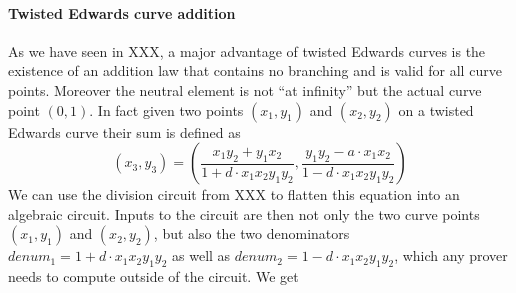 \paragraph{Twisted Edwards curve addition} As we have seen in XXX, a major advantage of twisted Edwards curves is the existence of an addition law that contains no branching and is valid for all curve points. Moreover the neutral element is not ``at infinity'' but the actual curve point $(0,1)$. In fact given two points $(x_1,y_1)$ and $(x_2,y_2)$ on a twisted Edwards curve their sum is defined as
$$
(x_3,y_3) = \left(\frac{x_1y_2+y_1x_2}{1+d\cdot x_1x_2y_1y_2}, \frac{y_1y_2-a\cdot x_1x_2}{1-d\cdot x_1x_2y_1y_2}\right)
$$
We can use the division circuit from XXX to flatten this equation into an algebraic circuit. Inputs to the circuit are then not only the two curve points $(x_1,y_1)$ and $(x_2,y_2)$, but also the two denominators $denum_1 = 1+d\cdot x_1x_2y_1y_2$ as well as $denum_2= 1-d\cdot x_1x_2y_1y_2$, which any prover needs to compute outside of the circuit. We get
